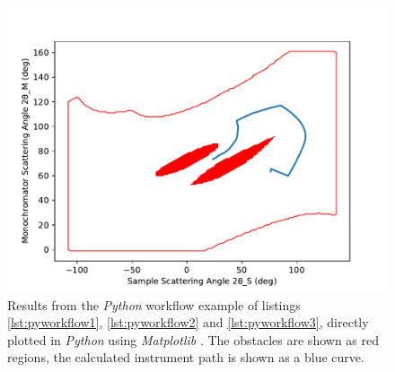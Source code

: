 \begin{figure}[htb]
		\begin{center}
			\includegraphics[width = 0.66 \textwidth]{figures/pyworkflow}
		\end{center}
	\caption[Python workflow results.]{Results from the \textit{Python} workflow example of listings
		\ref{lst:pyworkflow1}, \ref{lst:pyworkflow2} and \ref{lst:pyworkflow3}, directly plotted 
		in \textit{Python} using \textit{Matplotlib} \cite{Hunter2007, web_matplotlib}.
		The obstacles are shown as red regions, the calculated instrument path is shown as a blue curve.
		\label{fig:pyworkflow}}
\end{figure}


